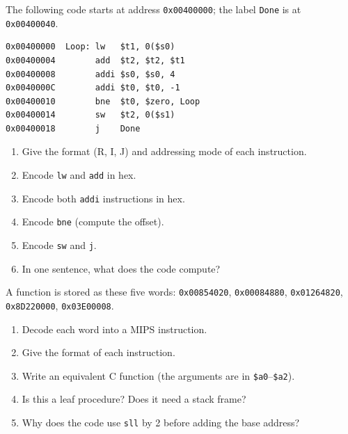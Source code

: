 \documentclass[11pt]{article}
\begin{document}
\begin{exercise}\label{x:loop}
The following code starts at address \texttt{0x00400000}; the label
\texttt{Done} is at \texttt{0x00400040}.
\begin{lstlisting}
0x00400000  Loop: lw   $t1, 0($s0)
0x00400004        add  $t2, $t2, $t1
0x00400008        addi $s0, $s0, 4
0x0040000C        addi $t0, $t0, -1
0x00400010        bne  $t0, $zero, Loop
0x00400014        sw   $t2, 0($s1)
0x00400018        j    Done
\end{lstlisting}
\begin{enumerate}[label=(\alph*),leftmargin=*]
  \item Give the format (R, I, J) and addressing mode of each instruction.
  \item Encode \texttt{lw} and \texttt{add} in hex.
  \item Encode both \texttt{addi} instructions in hex.
  \item Encode \texttt{bne} (compute the offset).
  \item Encode \texttt{sw} and \texttt{j}.
  \item In one sentence, what does the code compute?
\end{enumerate}
\end{exercise}

\begin{exercise}\label{x:decode}
A function is stored as these five words:
\texttt{0x00854020}, \texttt{0x00084880}, \texttt{0x01264820},
\texttt{0x8D220000}, \texttt{0x03E00008}.
\begin{enumerate}[label=(\alph*),leftmargin=*]
  \item Decode each word into a MIPS instruction.
  \item Give the format of each instruction.
  \item Write an equivalent C function (the arguments are in
  \texttt{\$a0}--\texttt{\$a2}).
  \item Is this a leaf procedure? Does it need a stack frame?
  \item Why does the code use \texttt{sll} by 2 before adding the base
  address?
\end{enumerate}
\end{exercise}
\end{document}
